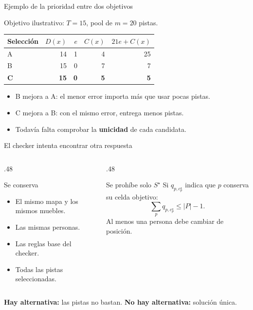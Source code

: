 \documentclass[aspectratio=169,11pt]{beamer}
\begin{document}
\begin{frame}{Ejemplo de la prioridad entre dos objetivos}
  \begin{center}
    Objetivo ilustrativo: \(T=15\), pool de \(m=20\) pistas.
    \medskip

    \begin{tabular}{lrrrr}
      \toprule
      Selecci\'on & \(D(x)\) & \(e\) & \(C(x)\) & \(21e+C(x)\)\\
      \midrule
      A & 14 & 1 & 4 & 25\\
      B & 15 & 0 & 7 & 7\\
      \textbf{C} & \textbf{15} & \textbf{0} & \textbf{5} & \textbf{5}\\
      \bottomrule
    \end{tabular}
  \end{center}
  \vspace{4mm}
  \begin{itemize}
    \item B mejora a A: el menor error importa m\'as que usar pocas pistas.
    \item C mejora a B: con el mismo error, entrega menos pistas.
    \item Todav\'ia falta comprobar la \textbf{unicidad} de cada candidata.
  \end{itemize}
\end{frame}

\begin{frame}{El checker intenta encontrar otra respuesta}
  \begin{columns}[T,onlytextwidth]
    \begin{column}{.48\textwidth}
      \begin{block}{Se conserva}
        \begin{itemize}
          \item El mismo mapa y los mismos muebles.
          \item Las mismas personas.
          \item Las reglas base del checker.
          \item Todas las pistas seleccionadas.
        \end{itemize}
      \end{block}
    \end{column}
    \begin{column}{.48\textwidth}
      \begin{exampleblock}{Se proh\'ibe solo \(S^\star\)}
        Si \(q_{p,c_p^\star}\) indica que \(p\) conserva su celda objetivo:
        \[
          \sum_p q_{p,c_p^\star}\leq |P|-1.
        \]
        Al menos una persona debe cambiar de posici\'on.
      \end{exampleblock}
    \end{column}
  \end{columns}
  \vspace{4mm}
  \centering
  \textbf{Hay alternativa:} las pistas no bastan.\qquad
  \textbf{No hay alternativa:} soluci\'on \'unica.
\end{frame}
\end{document}
